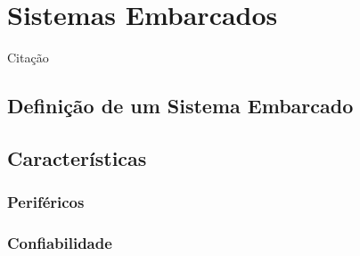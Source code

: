 \section{Sistemas Embarcados}
\label{sec:STR}
Citação~\cite{Li:2003:RCE:829584}

\subsection{Definição de um Sistema Embarcado}
\label{sec:DefSTR}

\subsection{Características}

\subsubsection{Periféricos}

\subsubsection{Confiabilidade}

